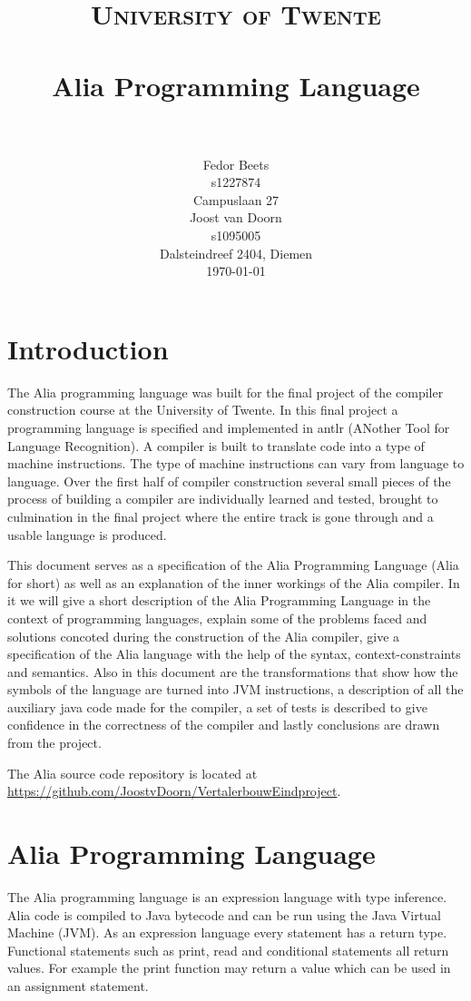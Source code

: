 \documentclass[paper=a4, fontsize=11pt]{article}
\title{
		\usefont{OT1}{bch}{b}{n}
		\normalfont \normalsize \textsc{University of Twente} \\ [25pt]
		\horrule{0.5pt} \\[0.4cm]
		\huge Alia Programming Language \\
		\horrule{2pt} \\[0.5cm]
}
\author{
		\normalfont 								\normalsize
        Fedor Beets\\[-3pt]						\small
        s1227874\\[-3pt]        				\small
        Campuslaan 27\\[8pt]					\normalsize
        Joost van Doorn\\[-3pt]					\small
        s1095005\\[-3pt]						\small
        Dalsteindreef 2404, Diemen\\[8pt]			\normalsize
        \today
}
\date{}
\numberwithin{equation}{section}		%
\numberwithin{figure}{section}			%
\numberwithin{table}{section}				%
\begin{document}
\maketitle
\newpage
\section*{Introduction}
The Alia programming language was built for the final project of the compiler construction course at the University of Twente. In this final project a programming language is specified and implemented in antlr (ANother Tool for Language Recognition). A compiler is built to translate code into a type of machine instructions. The type of machine instructions can vary from language to language. Over the first half of compiler construction several small pieces of the process of building a compiler are individually learned and tested, brought to culmination in the final project where the entire track is gone through and a usable language is produced. 

This document serves as a specification of the Alia Programming Language (Alia for short) as well as an explanation of the inner workings of the Alia compiler. In it we will give a short description of the Alia Programming Language in the context of programming languages, explain some of the problems faced and solutions concoted during the construction of the Alia compiler,  give a specification of the Alia language with the help of the syntax, context-constraints and semantics. Also in this document are the transformations that show how the symbols of the language are turned into JVM instructions, a description of all the auxiliary java code made for the compiler, a set of tests is described to give confidence in the correctness of the compiler and lastly conclusions are drawn from the project.

The Alia source code repository is located at \url{https://github.com/JoostvDoorn/VertalerbouwEindproject}.

\section{Alia Programming Language}
The Alia programming language is an expression language with type inference. Alia code is compiled to Java bytecode and can be run using the Java Virtual Machine (JVM). As an expression language every statement has a return type. Functional statements such as print, read and conditional statements all return values. For example the print function may return a value which can be used in an assignment statement.
\end{document}

